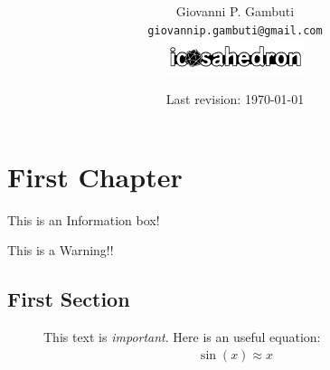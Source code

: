 
\title{\colorbox{warmblack}{{}}}
\author{Giovanni P. Gambuti \\ \texttt{giovannip.gambuti@gmail.com} \\
\includegraphics[width=0.3\textwidth]{images/logo_finale.png} } 
\date{ \small Last revision: \today}




\renewcommand{\listtablename}{Tables}

\dominitoc

\setlength{\tabcolsep}{0.5em} %
\renewcommand{\arraystretch}{1.2} %

 
\cleardoublepage

\setcounter{page}{1}
\tableofcontents
\newpage
\setcounter{page}{1}

\pagestyle{fancy}

\chapter{First Chapter}
\minitoc

\begin{info}
    This is an Information box!
\end{info}

\begin{warn}[Warning:]
    This is a Warning!!
\end{warn}
\lipsum[3-5]

\section{First Section}
\begin{figure}
\begin{YStkyNote}

This text is \emph{important}. Here is an useful equation:
\begin{align}
    \sin (x) \approx x
\end{align}
\end{YStkyNote}
\end{figure}

